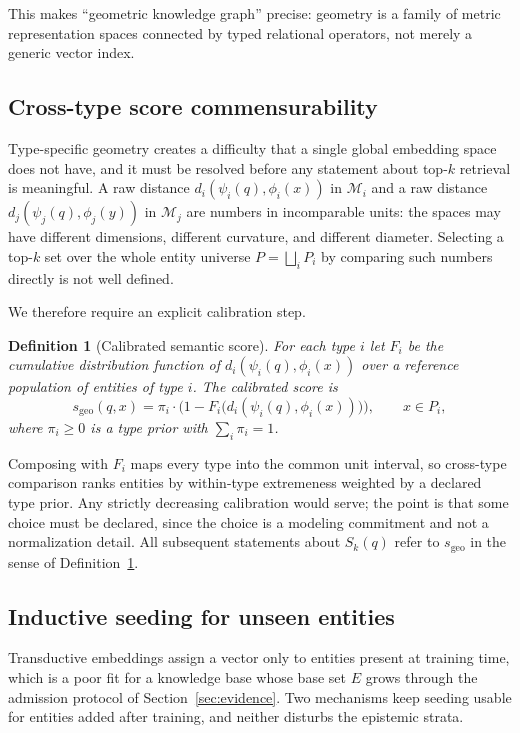 \documentclass[11pt]{article}
\newtheorem{definition}{Definition}[section]
\newcommand{\M}{\mathcal{M}}
\begin{document}
This makes ``geometric knowledge graph'' precise: geometry is a family of metric representation spaces connected by typed relational operators, not merely a generic vector index.

\subsection{Cross-type score commensurability}
\label{sec:commensurable}

Type-specific geometry creates a difficulty that a single global embedding space does not have, and it must be resolved before any statement about top-$k$ retrieval is meaningful. A raw distance $d_i(\psi_i(q),\phi_i(x))$ in $\M_i$ and a raw distance $d_j(\psi_j(q),\phi_j(y))$ in $\M_j$ are numbers in incomparable units: the spaces may have different dimensions, different curvature, and different diameter. Selecting a top-$k$ set over the whole entity universe $P=\bigsqcup_i P_i$ by comparing such numbers directly is not well defined.

We therefore require an explicit calibration step.

\begin{definition}[Calibrated semantic score]
\label{def:calibrated}
For each type $i$ let $F_i$ be the cumulative distribution function of $d_i(\psi_i(q),\phi_i(x))$ over a reference population of entities of type $i$. The calibrated score is
\[
s_{\mathrm{geo}}(q,x)=\pi_i\cdot\bigl(1-F_i\bigl(d_i(\psi_i(q),\phi_i(x))\bigr)\bigr),
\qquad x\in P_i,
\]
where $\pi_i\ge0$ is a type prior with $\sum_i\pi_i=1$.
\end{definition}

Composing with $F_i$ maps every type into the common unit interval, so cross-type comparison ranks entities by within-type extremeness weighted by a declared type prior. Any strictly decreasing calibration would serve; the point is that some choice must be declared, since the choice is a modeling commitment and not a normalization detail. All subsequent statements about $S_k(q)$ refer to $s_{\mathrm{geo}}$ in the sense of Definition~\ref{def:calibrated}.

\subsection{Inductive seeding for unseen entities}
\label{sec:inductive}

Transductive embeddings assign a vector only to entities present at training time, which is a poor fit for a knowledge base whose base set $E$ grows through the admission protocol of Section~\ref{sec:evidence}. Two mechanisms keep seeding usable for entities added after training, and neither disturbs the epistemic strata.
\end{document}
